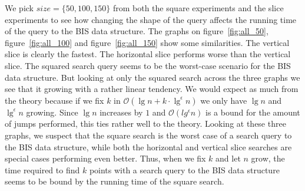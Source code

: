 We pick $size=\{50,100,150\}$ from both the square experiments and the slice experiments to see how changing the shape of the query affects the running time of the query to the BIS data structure. The graphs on figure~\ref{fig:all_50}, figure~\ref{fig:all_100} and figure~\ref{fig:all_150} show some similarities. The vertical slice is clearly the fastest. The horizontal slice performs worse than the vertical slice. The squared search query seems to be the worst-case scenario for the BIS data structure. But looking at only the squared search across the three graphs we see that it growing with a rather linear tendency. We would expect as much from the theory because if we fix $k$ in $\mathcal{O}(\lg n + k\cdot \lg^\epsilon n)$ we only have $\lg n$ and $\lg^\epsilon n$ growing. Since $\lg n$ increases by $1$ and $\mathcal{O}(lg^\epsilon n)$ is a bound for the amount of jumps performed, this ties rather well to the theory. Looking at these three graphs, we suspect that the square search is the worst case of a search query to the BIS data structure, while both the horizontal and vertical slice searches are special cases performing even better. Thus, when we fix $k$ and let $n$ grow, the time required to find $k$ points with a search query to the BIS data structure seems to be bound by the running time of the square search. 


